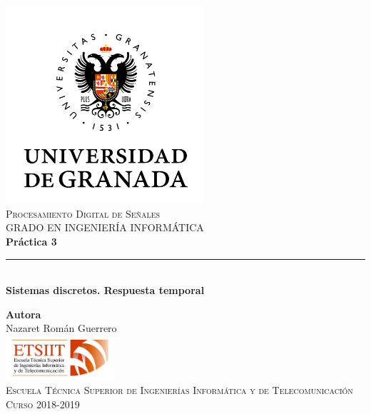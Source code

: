 \documentclass[11pt,a4paper]{article}
\begin{document}
\begin{titlepage}

\begin{minipage}{\textwidth}

\centering
\includegraphics[width=0.55\textwidth]{img/logo.png}\\

\textsc{\Large Procesamiento Digital de Señales\\[0.2cm]}
\textsc{GRADO EN INGENIERÍA INFORMÁTICA}\\[1cm]

{\Huge\bfseries Práctica 3\\}
\noindent\rule[-1ex]{\textwidth}{3pt}\\[3.5ex]
{\large\bfseries Sistemas discretos. Respuesta temporal}
\end{minipage}

\vspace{1.5cm}
\begin{minipage}{\textwidth}
\centering

\textbf{Autora}\\ {Nazaret Román Guerrero}\\[2.5ex]
\includegraphics[width=0.3\textwidth]{img/etsiit.jpeg}\\[0.1cm]
\vspace{1cm}
\textsc{Escuela Técnica Superior de Ingenierías Informática y de Telecomunicación}\\
\vspace{1cm}
\textsc{Curso 2018-2019}
\end{minipage}
\end{titlepage}
\end{document}
